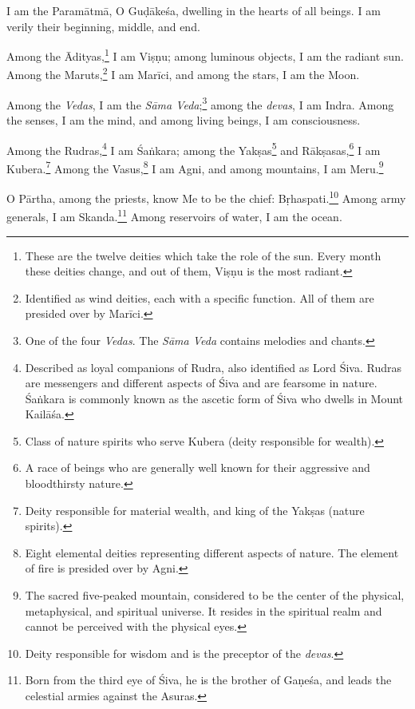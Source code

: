 {I am the Paramātmā, O Guḍākeśa, dwelling in the hearts of all beings. I am verily their beginning, middle, and end.}

{Among the Ādityas,\footnote{These are the twelve deities which take the role of the sun. Every month these deities change, and out of them, Viṣṇu is the most radiant.} I am Viṣṇu; among luminous objects, I am the radiant sun. Among the Maruts,\footnote{Identified as wind deities, each with a specific function. All of them are presided over by Marīci.} I am Marīci, and among the stars, I am the Moon.}

{Among the \textit{Vedas}, I am the \textit{Sāma Veda};\footnote{One of the four \textit{Vedas}. The \textit{Sāma Veda} contains melodies and chants.} among the \textit{devas}, I am Indra. Among the senses, I am the mind, and among living beings, I am consciousness.}

{Among the Rudras,\footnote{Described as loyal companions of Rudra, also identified as Lord Śiva. Rudras are messengers and different aspects of Śiva and are fearsome in nature. Śaṅkara is commonly known as the ascetic form of Śiva who dwells in Mount Kailāśa.} I am Śaṅkara; among the Yakṣas\footnote{Class of nature spirits who serve Kubera (deity responsible for wealth).} and Rākṣasas,\footnote{A race of beings who are generally well known for their aggressive and bloodthirsty nature.} I am Kubera.\footnote{Deity responsible for material wealth, and king of the Yakṣas (nature spirits).} Among the Vasus,\footnote{Eight elemental deities representing different aspects of nature. The element of fire is presided over by Agni.} I am Agni, and among mountains, I am Meru.\footnote{The sacred five-peaked mountain, considered to be the center of the physical, metaphysical, and spiritual universe. It resides in the spiritual realm and cannot be perceived with the physical eyes.}}

{O Pārtha, among the priests, know Me to be the chief: Bṛhaspati.\footnote{Deity responsible for wisdom and is the preceptor of the \textit{devas}.} Among army generals, I am Skanda.\footnote{Born from the third eye of Śiva, he is the brother of Gaṇeśa, and leads the celestial armies against the Asuras.} Among reservoirs of water, I am the ocean.}

